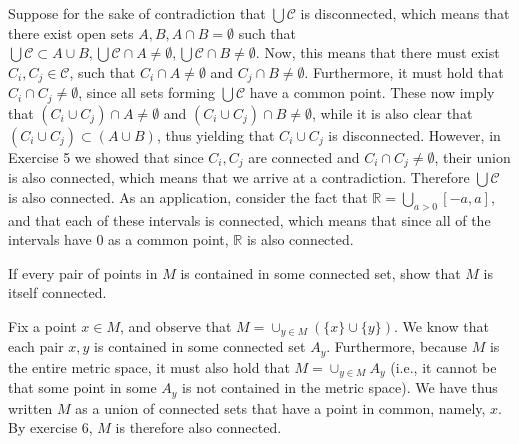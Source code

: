\begin{solution}
    
    Suppose for the sake of contradiction that $\bigcup \mathcal{C}$ is disconnected, which means that there exist open sets $A, B, A \cap B = \emptyset$ such that $\bigcup \mathcal{C} \subset A \cup B, \bigcup \mathcal{C} \cap A \neq \emptyset, \bigcup \mathcal{C} \cap B \neq \emptyset$.
    Now, this means that there must exist $C_i, C_j \in \mathcal{C}$, such that $C_i \cap A \neq \emptyset$ and $C_j \cap B \neq \emptyset$.
    Furthermore, it must hold that $C_i \cap C_j \neq \emptyset$, since all sets forming $\bigcup \mathcal{C}$ have a common point.
    These now imply that $(C_i \cup C_j) \cap A \neq \emptyset$ and $(C_i \cup C_j) \cap B \neq \emptyset$, while it is also clear that $(C_i \cup C_j) \subset (A \cup B)$, thus yielding that $C_i \cup C_j$ is disconnected.
    However, in Exercise 5 we showed that since $C_i, C_j$ are connected and $C_i \cap C_j \neq \emptyset$, their union is also connected, which means that we arrive at a contradiction.
    Therefore $\bigcup \mathcal{C}$ is also connected.
    As an application, consider the fact that $\mathbb{R} = \bigcup_{a > 0} [-a, a]$, and that each of these intervals is connected, which means that since all of the intervals have 0 as a common point, $\mathbb{R}$ is also connected.

\end{solution}

\begin{exercise}{7}
    If every pair of points in $M$ is contained in some connected set, show that $M$ is itself connected.
\end{exercise}

\begin{solution}
    
    Fix a point $x \in M$, and observe that $M = \cup_{y \in M} (\{x\} \cup \{y\})$.
    We know that each pair $x, y$ is contained in some connected set $A_y$.
    Furthermore, because $M$ is the entire metric space, it must also hold that $M = \cup_{y \in M} A_y$ (i.e., it cannot be that some point in some $A_y$ is not contained in the metric space).
    We have thus written $M$ as a union of connected sets that have a point in common, namely, $x$.
    By exercise 6, $M$ is therefore also connected.
\end{solution}
